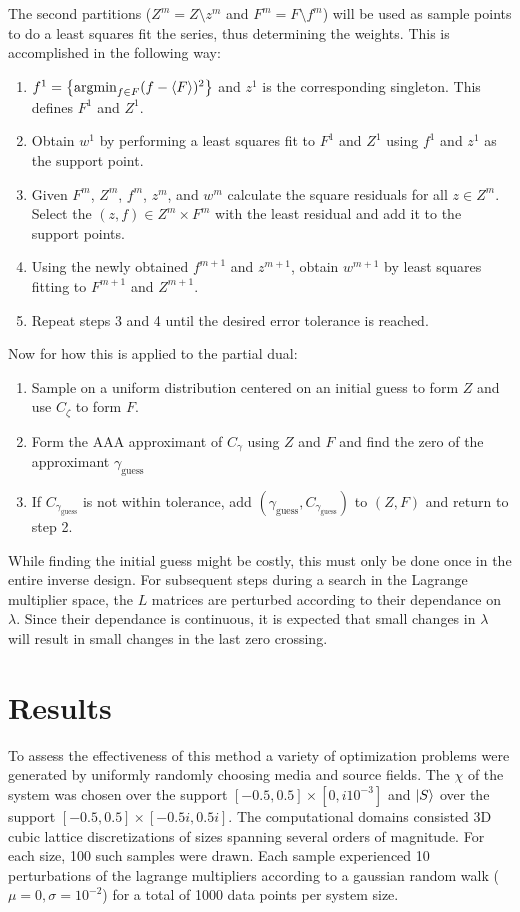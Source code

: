 \documentclass[twocolumn]{revtex4-2}
\begin{document}
The second partitions ($Z^m = Z\setminus z^m$ and $F^m = F\setminus f^m$) will be used as sample points to do a least squares fit the series, thus determining the weights. This is accomplished in the following way:
\begin{enumerate}
    \item $f^1 = \qty{\text{argmin}_{f\in F}(f-\ev{F})^2}$ and $z^1$ is the corresponding singleton. This defines $F^1$ and $Z^1$.
    \item Obtain $w^1$ by performing a least squares fit to $F^1$ and $Z^1$ using $f^1$ and $z^1$ as the support point.
    \item Given $F^m$, $Z^m$, $f^m$, $z^m$, and $w^m$ calculate the square residuals for all $z\in Z^m$. Select the $(z, f)\in Z^m\times F^m$ with the least residual and add it to the support points.
    \item Using the newly obtained $f^{m+1}$ and $z^{m+1}$, obtain $w^{m+1}$ by least squares fitting to $F^{m+1}$ and $Z^{m+1}$.
    \item Repeat steps 3 and 4 until the desired error tolerance is reached.
\end{enumerate}

Now for how this is applied to the partial dual:
\begin{enumerate}
    \item Sample on a uniform distribution centered on an initial guess to form $Z$ and use $C_\zeta$ to form $F$.
    \item Form the AAA approximant of $C_\gamma$ using $Z$ and $F$ and find the zero of the approximant $\gamma_\text{guess}$
    \item If $C_{\gamma_\text{guess}}$ is not within tolerance, add $(\gamma_\text{guess}, C_{\gamma_\text{guess}})$ to $(Z, F)$ and return to step 2.
\end{enumerate}
While finding the initial guess might be costly, this must only be done once in the entire inverse design. For subsequent steps during a search in the Lagrange multiplier space, the $L$ matrices are perturbed according to their dependance on $\lambda$. Since their dependance is continuous, it is expected that small changes in $\lambda$ will result in small changes in the last zero crossing.

\section{Results}
\label{sec:results}
To assess the effectiveness of this method a variety of optimization problems were generated by uniformly randomly choosing media and source fields. The $\chi$ of the system was chosen over the support $[-0.5, 0.5]\times[0, i10^{-3}]$ and $\ket{S}$ over the support $[-0.5, 0.5]\times[-0.5i, 0.5i]$. The computational domains consisted 3D cubic lattice discretizations of sizes spanning several orders of magnitude. For each size, 100 such samples were drawn. Each sample experienced 10 perturbations of the lagrange multipliers according to a gaussian random walk ($\mu=0, \sigma=10^{-2}$) for a total of 1000 data points per system size.
\end{document}
